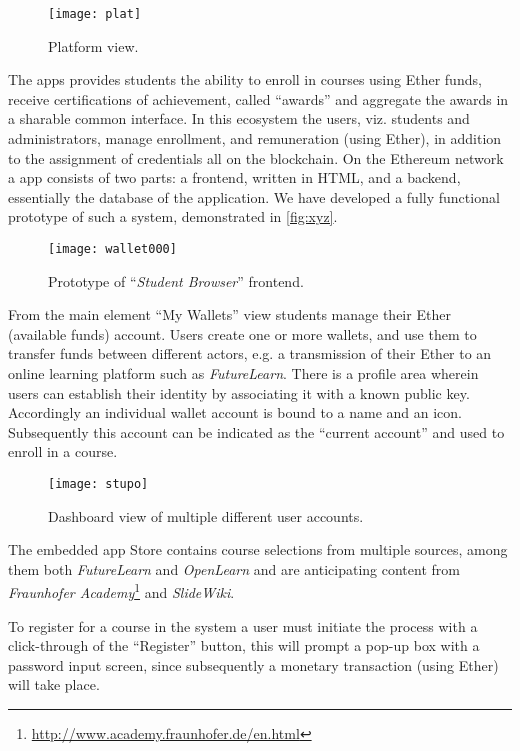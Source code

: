 \begin{figure}[!ht]
  \centering
      \texttt{[image: plat]}
  \caption{Platform view.}
    \label{fig:xyz}
\end{figure}

The \DJ{}apps provides students the ability to enroll in courses using Ether funds, receive certifications of achievement, called ``awards'' and aggregate the awards in a sharable common interface. 
In this ecosystem the users, viz. students and administrators, manage enrollment, and remuneration (using Ether), in addition to the assignment of credentials all on the blockchain.   
On the Ethereum network a \DJ{}app consists of two parts: a frontend, written in HTML, and a backend, essentially the database of the application. 
We have developed a fully functional prototype of such a system, demonstrated in \autoref{fig:xyz}. 

\begin{figure}[!ht]
  \centering
      \texttt{[image: wallet000]}
  \caption{Prototype of ``\textit{Student Browser}'' frontend.}
\end{figure}

From the main element ``My Wallets'' view students manage their Ether (available funds) account. 
Users create one or more wallets, and use them to transfer funds between different actors, e.g. a transmission of their Ether to an online learning platform such as \emph{FutureLearn}. 
There is a profile area wherein users can establish their identity by associating it with a known public key.
Accordingly an individual wallet account is bound to a name and an icon. 
Subsequently this account can be indicated as the ``current account'' and used to enroll in a course. 

\begin{figure}[!ht]
  \centering
      \texttt{[image: stupo]}
  \caption{Dashboard view of multiple different user accounts.}
\end{figure}

The embedded \DJ{}app Store contains course selections from multiple sources, among them both \emph{FutureLearn} and \emph{OpenLearn} and are anticipating content from \emph{Fraunhofer Academy}\footnote{\url{http://www.academy.fraunhofer.de/en.html}} and \emph{SlideWiki}.

To register for a course in the system a user must initiate the process with a click-through of the ``Register'' button, this will prompt a pop-up box with a password input screen, since subsequently a monetary transaction (using Ether) will take place. 


